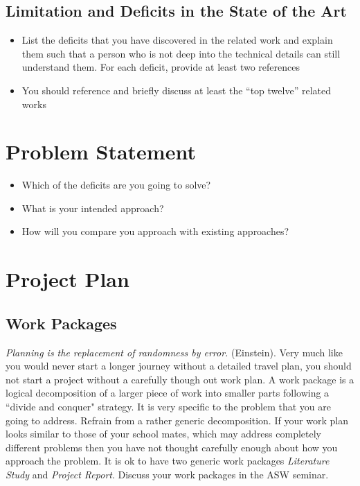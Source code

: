 \documentclass[rnd]{mas_proposal}
\begin{document}
\subsection{Limitation and Deficits in the State of the Art}
\begin{itemize}
    \item List the deficits that you have discovered in the related work and explain them such that a person who is not deep into the technical details can still understand them.
    For each deficit, provide at least two references
    \item You should reference and briefly discuss at least the ``top twelve'' related works
\end{itemize}

\section{Problem Statement}
\begin{itemize}
    \item Which of the deficits are you going to solve?
    \item What is your intended approach?
    \item How will you compare you approach with existing approaches?
\end{itemize}

\section{Project Plan}

\subsection{Work Packages}
\emph{Planning is the replacement of randomness by error.} (Einstein). Very much like you would never start a longer journey without a detailed travel plan, you should not start a project without a carefully though out work plan. A work package is a logical decomposition of a larger piece of work into smaller parts following a ``divide and conquer" strategy. It is very specific to the problem that you are going to address. Refrain from a rather generic decomposition. If your work plan looks similar to those of your school mates, which may address completely different problems then you have not thought carefully enough about how you approach the problem. It is ok to have two generic work packages \emph{Literature Study} and \emph{Project Report}. Discuss your work packages in the ASW seminar.
\end{document}
